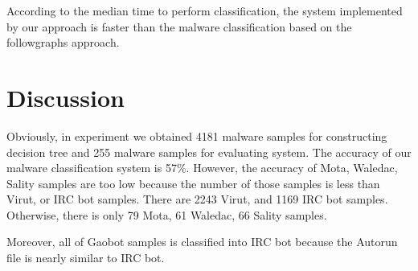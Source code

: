 According to the median time to perform classification, the system implemented by our approach is faster than the malware classification based on the followgraphs approach.
\section{Discussion}
Obviously, in experiment we obtained 4181 malware samples for constructing decision tree and 255 malware samples for evaluating system. The accuracy of our malware classification system is 57\%. However, the accuracy of Mota, Waledac, Sality samples are too low because the number of those samples is less than Virut, or IRC bot samples. There are 2243 Virut, and 1169 IRC bot samples. Otherwise, there is only 79 Mota, 61 Waledac, 66 Sality samples.

Moreover, all of Gaobot samples is classified into IRC bot because the Autorun file is nearly similar to IRC bot.